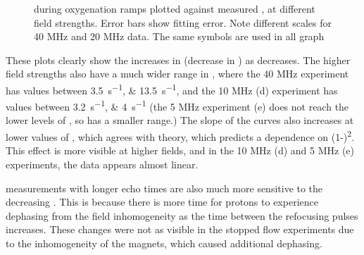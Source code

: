 \begin{figure}[h!p]

  \caption[\Rtwo vs \SOtwo at different field strengths]{\Rtwo during oxygenation ramps plotted against measured \SOtwo, at different field strengths. Error bars show fitting error. Note different \Rtwo scales for 40 MHz and 20 MHz data. The same symbols are used in all graph}
  \label{fig:contflow-R2SO2}
\end{figure}

These plots clearly show the increases in \Rtwo (decrease in \Ttwo) as \SOtwo decreases.
The higher field strengths also have a much wider range in \Rtwo, where the 40 MHz experiment has \Rtwo values between \SIlist{3.5;13.5}{s^{-1}}, and the 10 MHz (d) experiment has values between \SIlist{3.2;4}{s^{-1}} (the 5 MHz experiment (e) does not reach the lower levels of \SOtwo, so has a smaller range.)
The slope of the \Rtwo curves also increases at lower values of \SOtwo, which agrees with theory, which predicts a dependence on (1-\SOtwo)\textsuperscript{2}.
This effect is more visible at higher fields, and in the 10 MHz (d) and 5 MHz (e) experiments, the data appears almost linear.

\Rtwo measurements with longer echo times are also much more sensitive to the decreasing \SOtwo.
This is because there is more time for protons to experience dephasing from the field inhomogeneity as the time between the refocusing pulses increases.
These changes were not as visible in the stopped flow experiments due to the inhomogeneity of the magnets, which caused additional dephasing.


